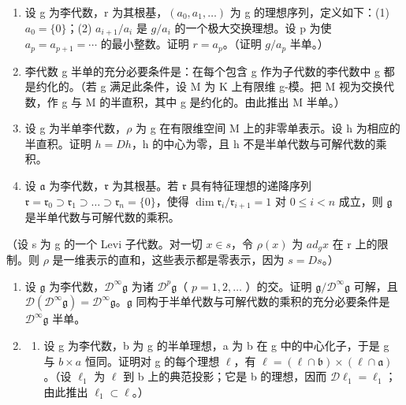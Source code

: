 \begin{enumerate}
\def\labelenumi{\arabic{enumi}.}
\setcounter{enumi}{1}
\item
  设 g 为李代数，r 为其根基，\((a_{0}, a_{1}, \ldots)\) 为 g 的理想序列，定义如下：(1) \(a_{0} = \{0\}\)；(2) \(a_{i+1}/a_{i}\) 是 \(g/a_{i}\) 的一个极大交换理想。设 p 为使 \(a_{p} = a_{p+1} = \cdots\) 的最小整数。证明 \(r = a_{p}\)。（证明 \(g/a_{p}\) 半单。）
\item
  李代数 g 半单的充分必要条件是：在每个包含 g 作为子代数的李代数中 g 都是约化的。（若 g 满足此条件，设 M 为 K 上有限维 g-模。把 M 视为交换代数，作 g 与 M 的半直积，其中 g 是约化的。由此推出 M 半单。）
\item
  设 g 为半单李代数，\(\rho\) 为 g 在有限维空间 M 上的非零单表示。设 h 为相应的半直积。证明 \(h = Dh\)，h 的中心为零，且 h 不是半单代数与可解代数的乘积。
\item
  设 \(\mathfrak{a}\) 为李代数，\(\mathfrak{r}\) 为其根基。若 \(\mathfrak{r}\) 具有特征理想的递降序列 \(\mathfrak{r} = \mathfrak{r}_0 \supset \mathfrak{r}_1 \supset \dots \supset \mathfrak{r}_n = \{0\}\)，使得 \(\dim \mathfrak{r}_i / \mathfrak{r}_{i+1} = 1\) 对 \(0 \leqslant i < n\) 成立，则 \(\mathfrak{g}\) 是半单代数与可解代数的乘积。
\end{enumerate}

（设 s 为 g 的一个 Levi 子代数。对一切 \(x \in s\)，令 \(\rho(x)\) 为 \(ad_{g}x\) 在 r 上的限制。则 \(\rho\) 是一维表示的直和，这些表示都是零表示，因为 \(s = Ds\)。）

\begin{enumerate}
\def\labelenumi{\arabic{enumi}.}
\setcounter{enumi}{5}
\item
  设 \(\mathfrak{g}\) 为李代数，\(\mathcal{D}^{\infty}\mathfrak{g}\) 为诸 \(\mathcal{D}^{p}\mathfrak{g}\)（ \(p = 1,2,\ldots\) ）的交。证明 \(\mathfrak{g}/\mathcal{D}^{\infty}\mathfrak{g}\) 可解，且 \(\mathcal{D}(\mathcal{D}^{\infty}\mathfrak{g}) = \mathcal{D}^{\infty}\mathfrak{g}\)。\(\mathfrak{g}\) 同构于半单代数与可解代数的乘积的充分必要条件是 \(\mathcal{D}^{\infty}\mathfrak{g}\) 半单。
\item
  \begin{enumerate}
  \def\labelenumii{(\alph{enumii})}
  \tightlist
  \item
    设 g 为李代数，b 为 g 的半单理想，a 为 b 在 g 中的中心化子，于是 g 与 \(b \times a\) 恒同。证明对 g 的每个理想 \(\ell\)，有 \(\ell = (\ell \cap \mathfrak{b}) \times (\ell \cap \mathfrak{a})\)。（设 \(\ell_{1}\) 为 \(\ell\) 到 b 上的典范投影；它是 b 的理想，因而 \(\mathcal{D}\ell_{1} = \ell_{1}\)；由此推出 \(\ell_{1} \subset \ell\)。）
  \end{enumerate}
\end{enumerate}

